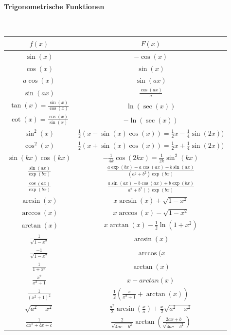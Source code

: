 \documentclass[a4paper,10pt]{article}
\begin{document}
\paragraph{Trigonometrische Funktionen} \
\begin{table}[H]
    \centering
    \begin{tabular}{cc}
          \( f(x)\) & \( F(x)\) \\
          \hline \hline
          \(\sin(x)\) & \(-\cos(x)\) \\
          \hline
          \(\cos(x)\) & \(\sin(x)\) \\
          \hline
          \(a \cos(x)\) & \(\sin(ax)\) \\
          \hline
          \(\sin(ax)\) & \(\frac{\cos(ax)}{a}\) \\
          \hline
          \(\tan(x) = \frac{\sin(x)}{\cos(x)}\) & \(\ln(\sec(x))\)    \\     
          \hline
         \( \cot(x)=\frac{\cos(x)}{\sin(x)} \) & \( -\ln(\sec(x)) \) \\
          \hline
         \( \sin^2(x) \) & \(\frac{1}{2}(x-\sin(x)\cos(x)) = \frac{1}{2}x - \frac{1}{4}\sin(2x))  \) \\
                  \hline
         \( \cos^2(x) \) & \( \frac{1}{2}(x+\sin(x)\cos(x)) = \frac{1}{2}x + \frac{1}{4}\sin(2x)) \) \\
         \hline
         \( \sin(kx)\cos(kx) \) & \( -\frac{1}{4k}\cos(2kx)=\frac{1}{2k}\sin^2(kx) \) \\
         \hline
         \( \frac{\sin(ax)}{\exp(bx)}\) & \( \frac{a\exp(bx)-a\cos(ax)-b\sin(ax)}{(a^2+b^2)\exp(bx)} \) \\
         \hline
         \( \frac{\cos(ax)}{\exp(bx)} \) & \( \frac{a\sin(ax)-b\cos(ax)+b\exp(bx)}{a^2+b^2()\exp(bx)} \) \\
         \hline
         \( \arcsin(x)\) & \( x\arcsin(x)+\sqrt{1-x^2}\) \\
         \hline
         \( \arccos(x) \) & \( x\arccos(x)-\sqrt{1-x^2} \) \\
         \hline
         \( \arctan(x) \) & \( x\arctan(x)-\frac{1}{2}\ln(1+x^2) \) \\
         \hline
         \( \frac{1}{\sqrt{1-x^2}} \) & \( \arcsin(x) \) \\
         \hline
         \( \frac{-1}{\sqrt{1-x^2}} \) & \( \arccos(x \) \\
         \hline
         \( \frac{1}{1+x^2} \) & \( \arctan(x) \) \\
         \hline
         \( \frac{x^2}{x^2+1} \) & \( x-arctan(x) \) \\
         \hline
         \( \frac{1}{(x^2+1)^2} \) & \( \frac{1}{2}(\frac{x}{x^2+1}+\arctan(x)) \) \\
         \hline
         \( \sqrt{a^2-x^2} \) & \( \frac{a^2}{2}\arcsin\left(\frac{x}{a}\right)+\frac{x}{2}\sqrt{a^2-x^2}\) \\
         \hline
         \( \frac{1}{ax^2+bx+c} \) & \( \frac{2}{\sqrt{4ac-b^2}}\arctan\left(\frac{2ax+b}{\sqrt{4ac-b^2}}\right) \) \\        
          
    \end{tabular}
\end{table}
\end{document}
